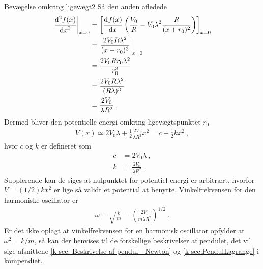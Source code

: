 \begin{opgave}{Bevægelse omkring ligevægt}{2}
Så den anden afledede
\begin{align*}
	 \left.\dif[2]{x}{f(x)}\right|_{x=0} &= \left[\dif{x}{f(x)}\left(\frac{V_0}{R} - V_0\lambda^2\frac{R}{(x+r_0)^2}\right)\right]_{x=0} \\
	 &= \left.\frac{2V_0R\lambda^2}{(x+r_0)^3}\right|_{x=0} \\
	 &= \frac{2V_0Rr_0\lambda^2}{r_0^3} \\
	 &= \frac{2V_0R\lambda^2}{(R\lambda)^3} \\
	 &= \frac{2V_0}{\lambda R^2} \: .
\end{align*}
Dermed bliver den potentielle energi omkring ligevægtspunktet $r_0$
\begin{align*}
	V(x) \simeq 2V_0\lambda + \frac{1}{2}\frac{2V_0}{\lambda R^2}x^2 = c + \frac{1}{2}kx^2 \: ,
\end{align*}
hvor $c$ og $k$ er defineret som
\begin{align*}
	c &= 2V_0\lambda \: ,\\
	k &= \frac{2V_0}{\lambda R^2} \: .
\end{align*}
Supplerende kan de siges at nulpunktet for potentiel energi er arbitrært, hvorfor $V = (1/2)kx^2$ er lige så validt et potential at benytte.
\opg Vinkelfrekvensen for den harmoniske oscillator er
\begin{align*}
	\omega = \sqrt{\frac{k}{m}} = \left(\frac{2V_0}{m\lambda R^2}\right)^{1/2} \: .
\end{align*}
Er det ikke oplagt at vinkelfrekvensen for en harmonisk oscillator opfylder at $\omega^2 = k/m$, så kan der henvises til de forskellige beskrivelser af pendulet, det vil sige afsnittene \ref{k-sec: Beskrivelse af pendul - Newton} og \ref{k-sec:PendulLagrange} i kompendiet.
\end{opgave}
%
%
